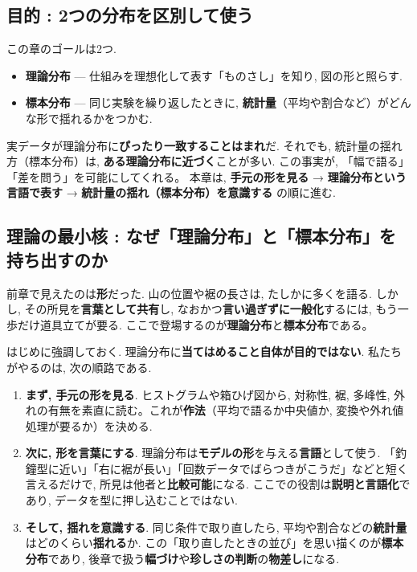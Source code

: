   \subsection{目的 : 2つの分布を区別して使う}
    この章のゴールは2つ.  
    \begin{itemize}
      \item \textbf{理論分布} — 仕組みを理想化して表す「ものさし」を知り, 図の形と照らす.  
      \item \textbf{標本分布} — 同じ実験を繰り返したときに, \textbf{統計量}（平均や割合など）がどんな形で揺れるかをつかむ.
    \end{itemize}
    実データが理論分布に\textbf{ぴったり一致することはまれ}だ. それでも, 統計量の揺れ方（標本分布）は, \textbf{ある理論分布に近づく}ことが多い.  
    この事実が, 「幅で語る」「差を問う」を可能にしてくれる。
    本章は, \textbf{手元の形を見る} → \textbf{理論分布という言語で表す} → \textbf{統計量の揺れ（標本分布）を意識する} の順に進む.

\subsection{理論の最小核 : なぜ「理論分布」と「標本分布」を持ち出すのか}
  前章で見えたのは\textbf{形}だった.
  山の位置や裾の長さは, たしかに多くを語る.  
  しかし, その所見を\textbf{言葉として共有}し, なおかつ\textbf{言い過ぎずに一般化}するには, もう一歩だけ道具立てが要る.
  ここで登場するのが\textbf{理論分布}と\textbf{標本分布}である。

  はじめに強調しておく. 
  理論分布に\textbf{当てはめること自体が目的ではない}.
  私たちがやるのは, 次の順路である.
  \begin{enumerate}
    \item \textbf{まず, 手元の形を見る}. ヒストグラムや箱ひげ図から, 対称性, 裾, 多峰性, 外れの有無を素直に読む。これが\textbf{作法}（平均で語るか中央値か, 変換や外れ値処理が要るか）を決める.
    \item \textbf{次に, 形を言葉にする}. 理論分布は\textbf{モデルの形}を与える\textbf{言語}として使う.
          「釣鐘型に近い」「右に裾が長い」「回数データでばらつきがこうだ」などと短く言えるだけで, 所見は他者と\textbf{比較可能}になる.  
          ここでの役割は\textbf{説明と言語化}であり, データを型に押し込むことではない.
    \item \textbf{そして, 揺れを意識する}. 同じ条件で取り直したら, 平均や割合などの\textbf{統計量}はどのくらい\textbf{揺れる}か.  
          この「取り直したときの並び」を思い描くのが\textbf{標本分布}であり, 後章で扱う\textbf{幅づけ}や\textbf{珍しさの判断}の\textbf{物差し}になる.
  \end{enumerate}

